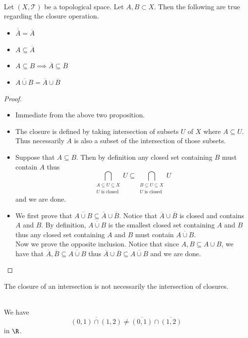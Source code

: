 \documentclass[a4paper]{article}
\begin{document}
\begin{prp}{}{}\\
Let $(X,\mathcal{T})$ be a topological space. Let $A,B\subset X$. Then the following are true regarding the closure operation. 
\begin{itemize}
\item $\overline{\overline{A}}=\overline{A}$
\item $A\subseteq\overline{A}$
\item $A\subseteq B\implies\overline{A}\subseteq\overline{B}$
\item $\overline{A\cup B}=\overline{A}\cup\overline{B}$
\end{itemize}
\begin{proof}\\
\begin{itemize}
\item Immediate from the above two proposition. 
\item The closure is defined by taking intersection of subsets $U$ of $X$ where $A\subseteq U$. Thus necessarily $A$ is also a subset of the intersection of those subsets. 
\item Suppose that $A\subseteq B$. Then by definition any closed set containing $B$ must contain $A$ thus $$\bigcap_{\substack{A\subseteq U\subseteq X\\U\text{ is closed}}}U\subseteq\bigcap_{\substack{B\subseteq U\subseteq X\\U\text{ is closed}}}U$$ and we are done. 
\item We first prove that $\overline{A\cup B}\subseteq\overline{A}\cup\overline{B}$. Notice that $\overline{A}\cup\overline{B}$ is closed and contains $A$ and $B$. By definition, $\overline{A\cup B}$ is the smallest closed set containing $A$ and $B$ thus any closed set containing $A$ and $B$ must contain $\overline{A\cup B}$. \\
Now we prove the opposite inclusion. Notice that since $A,B\subseteq A\cup B$, we have that $\overline{A},\overline{B}\subseteq\overline{A\cup B}$ thus $\overline{A}\cup\overline{B}\subseteq\overline{A\cup B}$ and we are done. 
\end{itemize}
\end{proof}
\end{prp}

The closure of an intersection is not necessarily the intersection of closures. 

\begin{eg}{}{}\\
We have $$\overline{(0,1)\cap(1,2)}\neq\overline{(0,1)}\cap\overline{(1,2)}$$ in $\R$. 
\end{eg}
\end{document}
